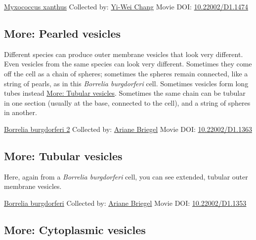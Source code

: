 \documentclass[]{tufte-book}
\begin{document}
\label{fig:2-4}\protect\hyperlink{tree}{Myxococcus xanthus} Collected by: \protect\hyperlink{yi-wei_chang}{Yi-Wei Chang} Movie DOI: \href{https://doi.org/10.22002/D1.1474}{10.22002/D1.1474}

\hypertarget{Pearled_vesicles}{%
\subsection*{More: Pearled vesicles}\label{Pearled_vesicles}}

Different species can produce outer membrane vesicles that look very different. Even vesicles from the same species can look very different. Sometimes they come off the cell as a chain of spheres; sometimes the spheres remain connected, like a string of pearls, as in this \emph{Borrelia burgdorferi} cell. Sometimes vesicles form long tubes instead \protect\hyperlink{Tubular_vesicles}{More: Tubular vesicles}. Sometimes the same chain can be tubular in one section (usually at the base, connected to the cell), and a string of spheres in another.



\hypertarget{htmlwidget-c677373d1aaf226e3fa5}{}

\label{fig:2-4a}\protect\hyperlink{tree}{Borrelia burgdorferi 2} Collected by: \protect\hyperlink{ariane_briegel}{Ariane Briegel} Movie DOI: \href{https://doi.org/10.22002/D1.1363}{10.22002/D1.1363}

\hypertarget{Tubular_vesicles}{%
\subsection*{More: Tubular vesicles}\label{Tubular_vesicles}}

Here, again from a \emph{Borrelia burgdorferi} cell, you can see extended, tubular outer membrane vesicles.



\hypertarget{htmlwidget-d0b0fdcb5be408a40db7}{}

\label{fig:2-4b}\protect\hyperlink{tree}{Borrelia burgdorferi} Collected by: \protect\hyperlink{ariane_briegel}{Ariane Briegel} Movie DOI: \href{https://doi.org/10.22002/D1.1353}{10.22002/D1.1353}

\hypertarget{Cytoplasmic_vesicles}{%
\subsection*{More: Cytoplasmic vesicles}\label{Cytoplasmic_vesicles}}
\end{document}
